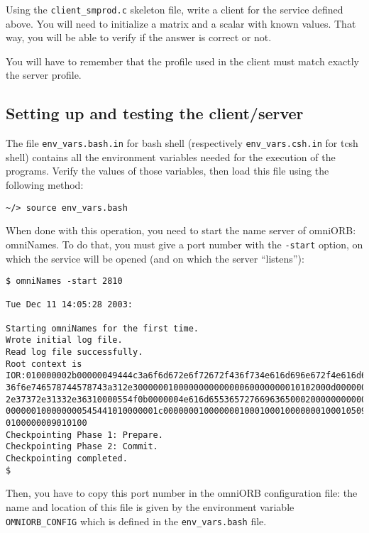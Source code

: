 \documentclass[11pt,a4paper]{article}
\begin{document}
Using the \texttt{client\_smprod.c} skeleton file, write a client for
the service defined above. You will need to initialize a matrix and a
scalar with known values. That way, you will be able to verify if the
answer is correct or not. \par

You will have to remember that the profile used in the client must match 
exactly the server profile.

\subsection{Setting up and testing the client/server}

The file \texttt{env\_vars.bash.in} for bash shell (respectively
\texttt{env\_vars.csh.in} for tcsh shell) contains all the environment
variables needed for the execution of the programs. Verify the values
of those variables, then load this file using the following method:

\footnotesize
\begin{verbatim}
~/> source env_vars.bash   
\end{verbatim}
\normalsize

When done with this operation, you need to start the name server of omniORB:
omniNames. To do that, you must give a port number with the \texttt{-start}
option, on which the service will be opened (and on which the server
``listens''):
\footnotesize
\begin{verbatim}
$ omniNames -start 2810

Tue Dec 11 14:05:28 2003:

Starting omniNames for the first time.
Wrote initial log file.
Read log file successfully.
Root context is
IOR:010000002b00000049444c3a6f6d672e6f72672f436f734e616d696e672f4e616d696e674
36f6e746578744578743a312e300000010000000000000060000000010102000d000000313430
2e37372e31332e36310000554f0b0000004e616d6553657276696365000200000000000000080
000000100000000545441010000001c0000000100000001000100010000000100010509010100
0100000009010100
Checkpointing Phase 1: Prepare.
Checkpointing Phase 2: Commit.
Checkpointing completed.
$
\end{verbatim}
\normalsize

Then, you have to copy this port number in the omniORB configuration file: the
name and location of this file is given by the environment variable 
\texttt{OMNIORB\_CONFIG} which is defined in the \texttt{env\_vars.bash} file.
\par
\end{document}
